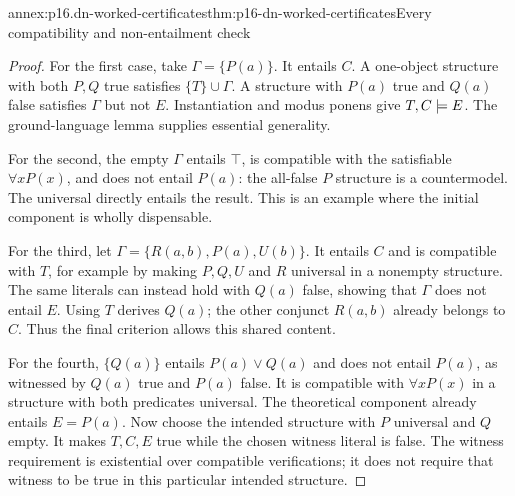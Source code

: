 \begin{annexitem}{annex:p16.dn-worked-certificates}{thm:p16-dn-worked-certificates}{Every compatibility and non-entailment check}
\begin{proof}
For the first case, take
\(\Gamma=\{P(a)\}\).
It entails \(C\).
A one-object structure with
both \(P,Q\) true satisfies
\(\{T\}\cup\Gamma\).
A structure with \(P(a)\)
true and \(Q(a)\) false
satisfies \(\Gamma\) but
not \(E\). Instantiation
and modus ponens give
\(T,C\models E\).
The ground-language lemma
supplies essential generality.

For the second, the empty
\(\Gamma\) entails \(\top\),
is compatible with the
satisfiable \(\forall xP(x)\),
and does not entail \(P(a)\):
the all-false \(P\) structure
is a countermodel.
The universal directly entails
the result. This is an example
where the initial component
is wholly dispensable.

For the third, let
\(\Gamma=\{R(a,b),P(a),U(b)\}\).
It entails \(C\) and is
compatible with \(T\), for
example by making \(P,Q,U\)
and \(R\) universal in a
nonempty structure.
The same literals can instead
hold with \(Q(a)\) false,
showing that \(\Gamma\)
does not entail \(E\).
Using \(T\) derives \(Q(a)\);
the other conjunct \(R(a,b)\)
already belongs to \(C\).
Thus the final criterion
allows this shared content.

For the fourth, \(\{Q(a)\}\)
entails \(P(a)\lor Q(a)\)
and does not entail \(P(a)\),
as witnessed by \(Q(a)\)
true and \(P(a)\) false.
It is compatible with
\(\forall xP(x)\) in a
structure with both predicates
universal. The theoretical
component already entails
\(E=P(a)\).
Now choose the intended
structure with \(P\) universal
and \(Q\) empty. It makes
\(T,C,E\) true while the
chosen witness literal is
false. The witness requirement
is existential over compatible
verifications; it does not
require that witness to be
true in this particular
intended structure.
\end{proof}
\end{annexitem}

